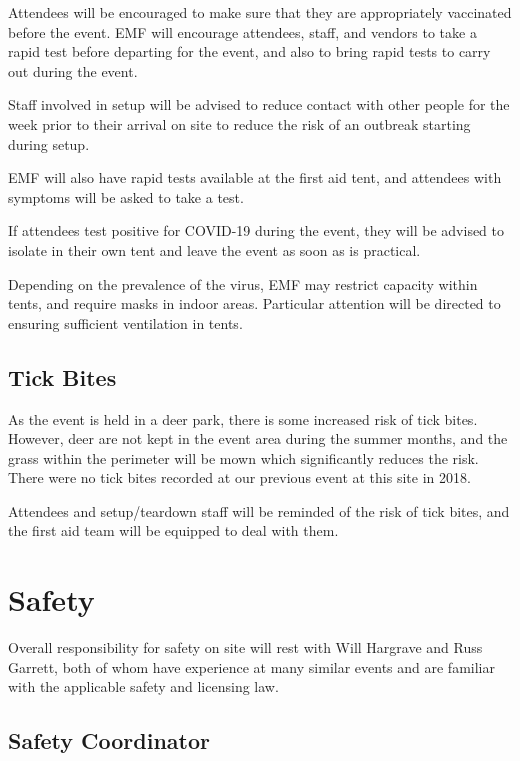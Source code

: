 Attendees will be encouraged to make sure that they are appropriately vaccinated before the event.
EMF will encourage attendees, staff, and vendors to take a rapid test before
departing for the event, and also to bring rapid tests to carry out during the event.

Staff involved in setup will be advised to reduce contact with other people for the week prior to
their arrival on site to reduce the risk of an outbreak starting during setup.

EMF will also have rapid tests available at the first aid tent, and attendees with symptoms
will be asked to take a test.

If attendees test positive for COVID-19 during the event, they will be advised to isolate in
their own tent and leave the event as soon as is practical.

Depending on the prevalence of the virus, EMF may restrict capacity within tents, and
require masks in indoor areas. Particular attention will be directed to ensuring sufficient
ventilation in tents.

\subsection{Tick Bites}

As the event is held in a deer park, there is some increased risk of tick bites. However, deer
are not kept in the event area during the summer months, and the grass within the perimeter
will be mown which significantly reduces the risk. There were no tick bites recorded at our
previous event at this site in 2018.

Attendees and setup/teardown staff will be reminded of the risk of tick bites, and the first aid team
will be equipped to deal with them.

\newpage

\section{Safety}\label{safety}

Overall responsibility for safety on site will rest with Will Hargrave and
Russ Garrett, both of whom have experience at many similar events and are
familiar with the applicable safety and licensing law.

\subsection{Safety Coordinator}

